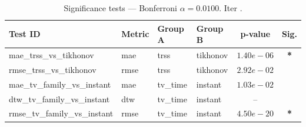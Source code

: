 ﻿%
\begin{table}[ht]
\centering
\caption[EEG reconstruction - Iteration it25]{Significance tests — Bonferroni $\alpha=0.0100$. Iter .}
\label{tab:sig_it25_alpha_beta_two_bands}
\small
\begin{tabular}{llllcc}
\toprule
Test ID & Metric & Group A & Group B & p-value & Sig. \\
\midrule
mae\_trss\_vs\_tikhonov & mae & trss & tikhonov & $1.40e-06$ & \textbf{*} \\
rmse\_trss\_vs\_tikhonov & rmse & trss & tikhonov & $2.92e-02$ &  \\
mae\_tv\_family\_vs\_instant & mae & tv\_time & instant & $1.03e-02$ &  \\
dtw\_tv\_family\_vs\_instant & dtw & tv\_time & instant & -- &  \\
rmse\_tv\_family\_vs\_instant & rmse & tv\_time & instant & $4.50e-20$ & \textbf{*} \\
\bottomrule
\end{tabular}
\end{table}







